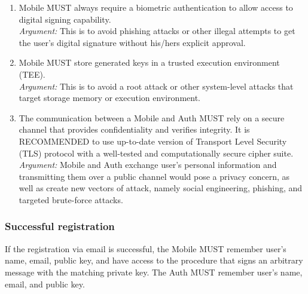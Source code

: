 \begin{enumerate}
                  \item Mobile MUST always require a biometric authentication to allow access to digital signing 
                        capability.\\        
                  \textit{Argument:} This is to avoid phishing attacks or other illegal attempts to get the user's 
                  digital signature without his/hers explicit approval.

                  \item Mobile MUST store generated keys in a trusted execution environment (TEE).\\        
                  \textit{Argument:} This is to avoid a root attack or other system-level attacks that target storage 
                  memory or execution environment.

                  \item The communication between a Mobile and Auth MUST rely on a secure channel that provides 
                        confidentiality and verifies integrity. It is RECOMMENDED to use up-to-date version of 
                        Transport Level Security (TLS) protocol with a well-tested and computationally secure 
                        cipher suite.\\      
                  \textit{Argument:} Mobile and Auth exchange user's personal information and transmitting them over a 
                  public channel would pose a privacy concern, as well as create new vectors of attack, 
                  namely social engineering, phishing, and targeted brute-force attacks.
            \end{enumerate}

            \subsubsection{Successful registration}
            If the registration via email is successful, the Mobile MUST remember user's name, email, public key, and 
            have access to the procedure that signs an arbitrary message with the matching private key. The Auth MUST 
            remember user's name, email, and public key.

